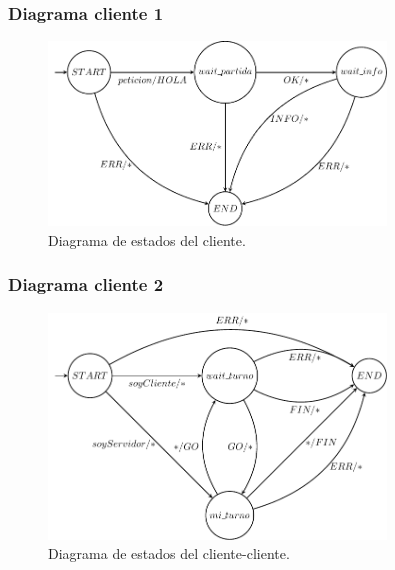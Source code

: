 \documentclass{beamer}
\begin{document}
\begin{frame}
	\frametitle{Diagrama cliente 1}
	\begin{figure}[H]
    \centering
    \includegraphics[width=0.8\textwidth]{DiagramaCliente1.pdf}
    \caption{Diagrama de estados del cliente.}
\end{figure}
\end{frame}

\begin{frame}
	\frametitle{Diagrama cliente 2}
	\begin{figure}[H]
    \centering
    \includegraphics[width=0.8\textwidth]{DiagramaCliente2.pdf}
    \caption{Diagrama de estados del cliente-cliente.}
\end{figure}
\end{frame}
\end{document}
